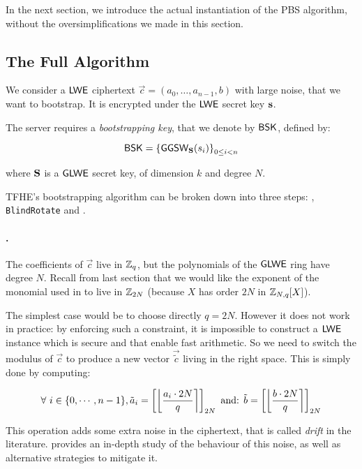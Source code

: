 \bigskip

In the next section, we introduce the actual instantiation of the PBS algorithm, without the oversimplifications we made in this section.

\subsection{The Full Algorithm}
\label{sec:pbs_algorithm}

We consider a $\textsf{LWE}$ ciphertext $\vec c = (a_0, \dots, a_{n-1}, b)$ with large noise, that we want to bootstrap. It is encrypted under the $\textsf{LWE}$ secret key $\mathbf s$. 

The server requires a \textit{bootstrapping key}, that we denote by $\textsf{BSK}$, defined by:

\[
	\textsf{BSK} = \left \lbrace \textsf{GGSW}_{\mathbf S}(s_i) \right \rbrace_{0 \le i < n}
\]

where $\mathbf S$ is a $\textsf{GLWE}$ secret key, of dimension $k$ and degree $N$.

\bigskip
TFHE's bootstrapping algorithm can be broken down into three steps: \ModSwitch, \texttt{BlindRota\-te} and \SampleExtract.

\paragraph{\ModSwitch.} The coefficients of $\vec c$ live in $\mathbb{Z}_q$, but the polynomials of the $\textsf{GLWE}$ ring have degree $N$. Recall from last section that we would like the exponent of the monomial used in \BlindRotate to live in $\mathbb{Z}_{2N}$ (because $X$ has order $2N$ in $\mathbb{Z}_{N,q}[X]$).

The simplest case would be to choose directly $q = 2N$. However it does not work in practice: by enforcing such a constraint, it is impossible to construct a $\textsf{LWE}$ instance which is secure and that enable fast arithmetic. So we need to switch the modulus of $\vec c$ to produce a new vector $\vec{\tilde c}$ living in the right space. This is simply done by computing:

\[
	\forall~i \in \{0, \cdots, n-1\}, \tilde a_i = \left [ \left \lfloor \frac{a_i \cdot 2N}{q} \right \rceil \right ]_{2N} \text{ and: } \tilde b = \left [ \left \lfloor \frac{b \cdot 2N}{q} \right \rceil \right ]_{2N}
\]


This operation adds some extra noise in the ciphertext, that is called \textit{drift} in the literature. \cite{joye_drift} provides an in-depth study of the behaviour of this noise, as well as alternative strategies to mitigate it.


